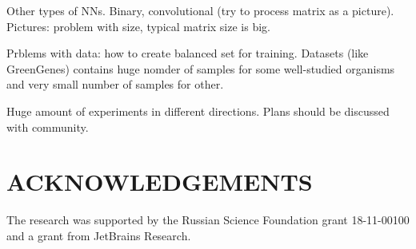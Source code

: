 \documentclass[a4paper,twoside]{article}
\begin{document}
Other types of NNs.
Binary, convolutional (try to process matrix as a picture).
Pictures: problem with size, typical matrix size is big.

Prblems with data: how to create balanced set for training.
Datasets (like GreenGenes) contains huge nomder of samples for some well-studied organisms and very small number of samples for other.

Huge amount of experiments in different directions.
Plans should be discussed with community.


\section*{\uppercase{Acknowledgements}}

\noindent The research was supported by the Russian Science Foundation grant 18-11-00100 and a grant from JetBrains Research.


\vfill

{\small
}


\vfill
\end{document}
